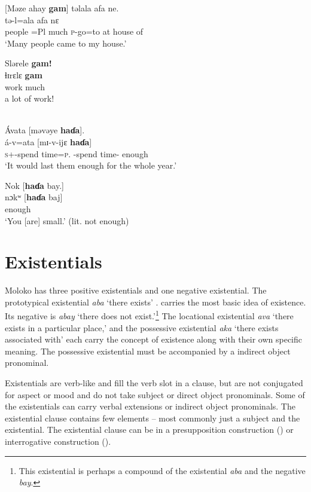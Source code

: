 \ea \label{ex:3:81}
[Məze  ahay  \textbf{gam}]  təlala  afa  ne.\\
\gll  [mɪʒɛ =ahaj  \textbf{gam}]  tə-l=ala    afa    nɛ\\
      people  =Pl  much  \textsc{p}-go=to  {at house of}  {\oneS}\\
\glt  ‘Many people came to my house.’
\z

\ea \label{ex:3:82}
 Slərele  \textbf{gam!}\\
\gll  ɬɪrɛlɛ   \textbf{gam}\\
      work  much\\
\glt  [That is] a lot of work!
\z

\ea\label{ex:3:83}\\
Ávata  [məvəye  \textbf{haɗa}].\\
\gll  á-v=ata    [mɪ-v-ijɛ     \textbf{haɗa}]\\
      \textsc{s}+{\IFV}-{spend time}=\textsc{p}.{\IO}   {\NOM}{}-{spend time}-{\CL}     enough\\
\glt  ‘It would last them enough for the whole year.’  
\z

\ea \label{ex:3:84}
Nok [\textbf{haɗa}  bay.]\\
\gll  nɔkʷ  [\textbf{haɗa}   baj]\\
      {\twoS}    enough  {\NEG}\\
\glt  ‘You [are] small.’ (lit. not enough)
\z
{}
\section{Existentials}\label{sec:3.4}
\hypertarget{RefHeading1211121525720847}{}
Moloko has three positive existentials and one negative existential. The prototypical existential \textit{aba} ‘there exists’ . carries the most basic idea of existence. Its negative is \textit{abay} ‘there does not exist.’\footnote{This existential is perhaps a compound of the existential \textit{aba} and the negative \textit{bay}.} The locational existential \textit{ava} ‘there exists in a particular place,’ and the possessive existential \textit{aka} ‘there exists associated with’ each carry the concept of existence along with their own specific meaning. The possessive existential must be accompanied by a indirect object pronominal.  

Existentials are verb-like and fill the verb slot in a clause, but are not conjugated for aspect or mood and do not take subject or direct object pronominals. Some of the existentials can carry verbal extensions or indirect object pronominals. The existential clause contains few elements -- most commonly just a subject and the existential. The existential clause can be in a presupposition construction () or interrogative construction (). 

